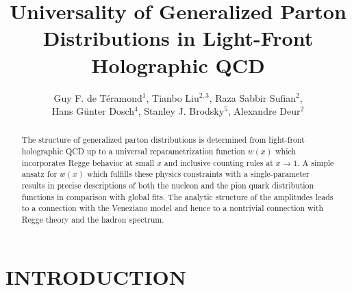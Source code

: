 \documentclass[aps,prl,reprint,groupedaddress, preprintnumbers]{revtex4-1}
\begin{document}


\title{Universality of Generalized Parton Distributions in Light-Front Holographic QCD}

\author{Guy F. de T\'eramond$^{1}$, Tianbo Liu$^{2,3}$, Raza Sabbir Sufian$^{2}$, \\ 
Hans G\"{u}nter Dosch$^{4}$, Stanley J. Brodsky$^{5}$,   Alexandre Deur$^{2}$}



 

\begin{abstract}


The structure of generalized parton distributions is determined from light-front holographic QCD up to a universal reparametrization function $w(x)$ which incorporates Regge behavior at small $x$ and inclusive counting rules at $x \to 1$. A simple ansatz for $w(x)$ which fulfills these physics constraints with a single-parameter results in precise descriptions of both the nucleon and the pion quark distribution functions in comparison with global fits. The analytic structure of the amplitudes leads to a connection with the Veneziano model and hence to a nontrivial connection with Regge theory and the hadron spectrum.


\end{abstract}


\pacs{}


\maketitle


\section{INTRODUCTION}
\end{document}
